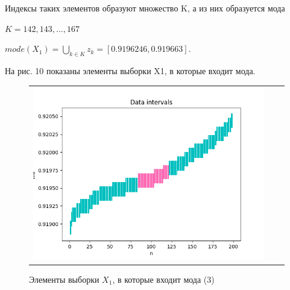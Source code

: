 \documentclass[a4paper,14pt]{article}
\begin{document}
	Индексы таких элементов образуют множество K, а из них образуется мода
	\begin{center}
		$K = {142, 143, ..., 167}$
	\end{center}
	\begin{center}
		$mode (X_1) = \bigcup_{k \in K} z_k = [0.9196246, 0.919663].$
	\end{center}
	На рис. 10 показаны элементы выборки X1, в которые входит мода.
	\begin{figure}[H]
		\begin{center}
			\begin{tabular}{ccc}
				\includegraphics[scale=0.8]{../image/data_and_intervals2.png}
			\end{tabular}
		\end{center}
		\caption{Элементы выборки $X_1$, в которые входит мода (3)} 
	\end{figure}
\end{document}
